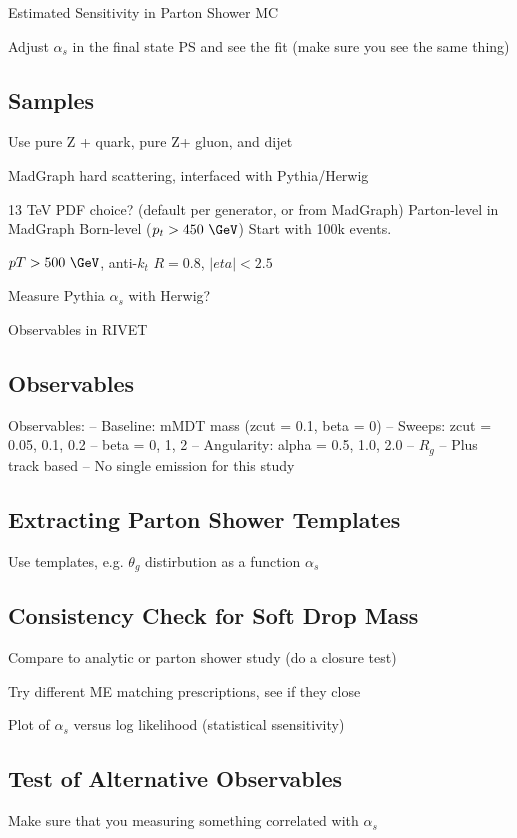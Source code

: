 

Estimated Sensitivity in Parton Shower MC

Adjust $\alpha_s$ in the final state PS and see the fit (make sure you see the same thing)

\subsection{Samples}

	Use pure Z + quark, pure Z+ gluon, and  dijet
	
	MadGraph hard scattering, interfaced with Pythia/Herwig
	
	13 TeV
	PDF choice?  (default per generator, or from MadGraph)
	Parton-level in MadGraph Born-level ($p_t > 450~\GeV$)
	Start with 100k events.
	
	
	$pT > 500~\GeV$, anti-$k_t$ $R = 0.8$, $|eta| < 2.5$

	
	
	Measure Pythia $\alpha_s$  with Herwig?
	
	Observables in RIVET

\subsection{Observables}


Observables:
-- Baseline:  mMDT mass (zcut = 0.1, beta = 0)
-- Sweeps:  zcut = 0.05, 0.1, 0.2
-- beta = 0, 1, 2
-- Angularity:  alpha = 0.5, 1.0, 2.0
-- $R_g$
-- Plus track based
-- No single emission for this study

\subsection{Extracting Parton Shower Templates}

	Use templates, e.g. $\theta_g$ distirbution as a function $\alpha_s$


\subsection{Consistency Check for Soft Drop Mass}
	Compare to analytic or parton shower study (do a closure test)

	Try different ME matching prescriptions, see if they close

	Plot of $\alpha_s$ versus log likelihood (statistical ssensitivity)

\subsection{Test of Alternative Observables}

Make sure that you measuring something correlated with $\alpha_s$


